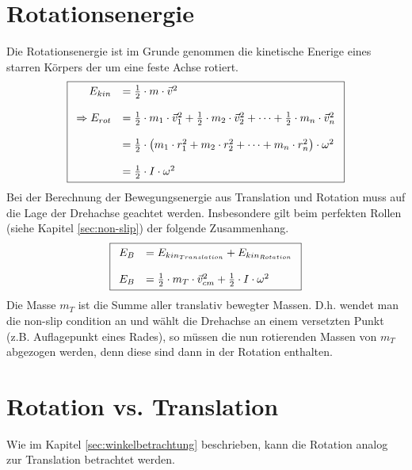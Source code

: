\section{Rotationsenergie}
Die Rotationsenergie ist im Grunde genommen die kinetische Enerige
eines starren Körpers der um eine feste Achse rotiert.
\[ \boxed{\begin{array}{r l}
	E_{kin} & = \frac{1}{2} \cdot m \cdot \vec{v}^2 \\
	& \\
	\Rightarrow E_{rot} & = \frac{1}{2} \cdot m_1 \cdot \vec{v}_1^2
			+ \frac{1}{2} \cdot m_2 \cdot \vec{v}_2^2
			+ \dots 
			+ \frac{1}{2} \cdot m_n \cdot \vec{v}_n^2 \\
	& \\
		& = \frac{1}{2} \cdot \left(m_1 \cdot r_1^2
			+ m_2 \cdot r_2^2 
			+ \dots
			+ m_n \cdot r_n^2\right) \cdot \omega^2 \\
	& \\
		& = \frac{1}{2} \cdot I \cdot \omega^2 
\end{array} } \]
Bei der Berechnung der Bewegungsenergie aus Translation und 
Rotation muss auf die Lage der Drehachse geachtet werden. Insbesondere 
gilt beim perfekten Rollen (siehe Kapitel \ref{sec:non-slip}) der 
folgende Zusammenhang.
\[ \boxed{\begin{array}{r l}
	E_B &= E_{kin_{Translation}} + E_{kin_{Rotation}} \\
	& \\
	E_B &= \frac{1}{2} \cdot m_T \cdot {\vec{v}_{cm}}^2 
		+ \frac{1}{2} \cdot I \cdot \omega^2 
\end{array}}\]
Die Masse $m_T$ ist die Summe aller translativ bewegter Massen. D.h. 
wendet man die non-slip condition an und wählt die Drehachse an einem 
versetzten Punkt (z.B. Auflagepunkt eines Rades), so müssen die nun
rotierenden Massen von $m_T$ abgezogen werden, denn diese sind dann in
der Rotation enthalten.
\newpage
\section{Rotation vs. Translation}
Wie im Kapitel \ref{sec:winkelbetrachtung} beschrieben, kann die 
Rotation analog zur Translation betrachtet werden.

